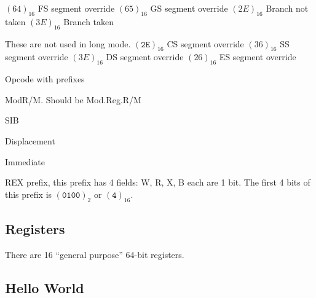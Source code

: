 $(64)_{16}$ FS segment override
$(65)_{16}$ GS segment override
$(2E)_{16}$ Branch not taken
$(3E)_{16}$ Branch taken

These are not used in long mode.
$(\texttt{2E})_{16}$ CS segment override
$(36)_{16}$ SS segment override
$(3E)_{16}$ DS segment override
$(26)_{16}$ ES segment override

Opcode with prefixes

ModR/M. Should be Mod.Reg.R/M

SIB

Displacement

Immediate

REX prefix, this prefix has 4 fields: W, R, X, B each are 1 bit. The first 4
bits of this prefix is $(\texttt{0100})_2$ or $(\texttt{4})_{16}$.

\subsection{Registers}

There are 16 ``general purpose'' 64-bit registers.

\begin{center}
\end{center}

\subsection{Hello World}

